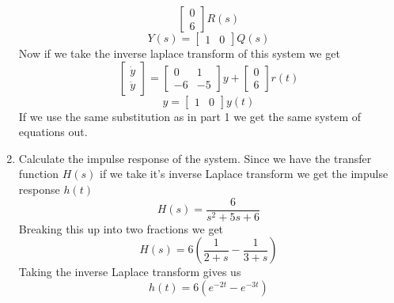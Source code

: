 \documentclass{article}
\begin{document}
\begin{enumerate}[1)]
$$\begin{bmatrix}
0 \\
6
\end{bmatrix}
R(s)
$$
$$ Y(s) = \begin{bmatrix} 1 & 0 \end{bmatrix} Q(s) $$
Now if we take the inverse laplace transform of this system we get
$$
\begin{bmatrix}
\dot{y} \\
\ddot{y}
\end{bmatrix}
=
\begin{bmatrix}
0 & 1 \\
-6 & -5
\end{bmatrix}
y
+
\begin{bmatrix}
0 \\
6
\end{bmatrix}
r(t)
$$
$$ y = \begin{bmatrix} 1 & 0 \end{bmatrix} y(t) $$
If we use the same substitution as in part 1 we get the same system of equations out.
\item Calculate the impulse response of the system.
\newline
Since we have the transfer function $H(s)$ if we take it's inverse Laplace transform we get the impulse response $h(t)$
$$H(s) = \frac{6}{s^2 + 5s + 6}$$
Breaking this up into two fractions we get
$$ H(s) = 6(\frac{1}{2+s} - \frac{1}{3+s}) $$
Taking the inverse Laplace transform gives us
$$ h(t) = 6(e^{-2 t} - e^{-3 t}) $$
\end{enumerate}

\newpage
\end{document}
